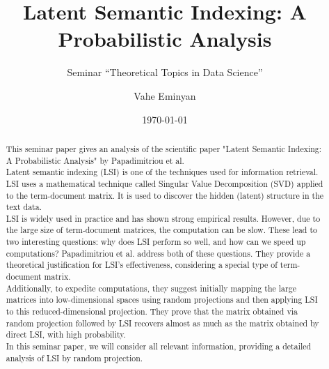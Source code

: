 \documentclass[a4paper,11pt,DIV=15]{scrartcl} %
\theoremstyle{plain}
\theoremstyle{definition}
\begin{document}
\subtitle{Seminar ``Theoretical Topics in Data Science''}
\date{\today}
\publishers{RWTH Aachen University}	%

\title{Latent Semantic Indexing: A Probabilistic Analysis}

\author{Vahe Eminyan}

\maketitle


\begin{abstract}
This seminar paper gives an analysis of the scientific paper "Latent Semantic Indexing: A Probabilistic Analysis" by Papadimitriou et al.\\
Latent semantic indexing (LSI) is one of the techniques used for information retrieval.
LSI uses a mathematical technique called Singular Value Decomposition (SVD) applied to the term-document matrix. It is used to discover the hidden (latent) structure in the text data.\\
LSI is widely used in practice and has shown strong empirical results. However, due to the large size of term-document matrices, the computation can be slow.
These lead to two interesting questions: why does LSI perform so well, and how can we speed up computations?
Papadimitriou et al. address both of these questions.
They provide a theoretical justification for LSI's effectiveness, considering a special type of term-document matrix.\\
Additionally, to expedite computations, they suggest initially mapping the large matrices into low-dimensional spaces using random projections and then applying LSI to this reduced-dimensional projection.
They prove that the matrix obtained via random projection followed by LSI recovers almost as
much as the matrix obtained by direct LSI, with high probability.\\
In this seminar paper, we will consider all relevant information, providing a detailed analysis of LSI by random projection.





\end{abstract}

\thispagestyle{empty}
\end{document}
